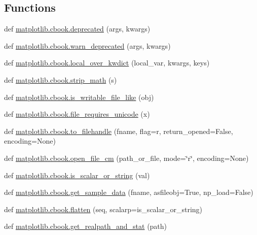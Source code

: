 \subsection*{Functions}
\begin{DoxyCompactItemize}
\item 
def \hyperlink{namespacematplotlib_1_1cbook_a5979ec40652233aee2a34f04e209e935}{matplotlib.\+cbook.\+deprecated} (args, kwargs)
\item 
def \hyperlink{namespacematplotlib_1_1cbook_a449199f6d127056fbb6ea42ebd0ca98c}{matplotlib.\+cbook.\+warn\+\_\+deprecated} (args, kwargs)
\item 
def \hyperlink{namespacematplotlib_1_1cbook_a293736790dc272651ffe29d54d8c877e}{matplotlib.\+cbook.\+local\+\_\+over\+\_\+kwdict} (local\+\_\+var, kwargs, keys)
\item 
def \hyperlink{namespacematplotlib_1_1cbook_aabc39eda5a8d0e60cdccc70fcf31011f}{matplotlib.\+cbook.\+strip\+\_\+math} (s)
\item 
def \hyperlink{namespacematplotlib_1_1cbook_a3f29aa0083b035701005f2ab74cd563d}{matplotlib.\+cbook.\+is\+\_\+writable\+\_\+file\+\_\+like} (obj)
\item 
def \hyperlink{namespacematplotlib_1_1cbook_a8e8aef949d3d004b55e40b5cec88fa0a}{matplotlib.\+cbook.\+file\+\_\+requires\+\_\+unicode} (x)
\item 
def \hyperlink{namespacematplotlib_1_1cbook_a1aee71b48934e4a383f1decb05b8e6d7}{matplotlib.\+cbook.\+to\+\_\+filehandle} (fname, flag=\textquotesingle{}r\textquotesingle{}, return\+\_\+opened=False, encoding=None)
\item 
def \hyperlink{namespacematplotlib_1_1cbook_a0d81ce7993d622e377e9d8412d626efd}{matplotlib.\+cbook.\+open\+\_\+file\+\_\+cm} (path\+\_\+or\+\_\+file, mode=\char`\"{}r\char`\"{}, encoding=None)
\item 
def \hyperlink{namespacematplotlib_1_1cbook_aa8e64eb7c542afa5d04be09e16c73607}{matplotlib.\+cbook.\+is\+\_\+scalar\+\_\+or\+\_\+string} (val)
\item 
def \hyperlink{namespacematplotlib_1_1cbook_a846b3b7e13d95cc8f596a8bbe7b62029}{matplotlib.\+cbook.\+get\+\_\+sample\+\_\+data} (fname, asfileobj=True, np\+\_\+load=False)
\item 
def \hyperlink{namespacematplotlib_1_1cbook_a30259be2209ddb2e1657d99d4bb80096}{matplotlib.\+cbook.\+flatten} (seq, scalarp=is\+\_\+scalar\+\_\+or\+\_\+string)
\item 
def \hyperlink{namespacematplotlib_1_1cbook_ad9abd637312c02b7c26d7d5037fddc5d}{matplotlib.\+cbook.\+get\+\_\+realpath\+\_\+and\+\_\+stat} (path)

\end{DoxyCompactItemize}
